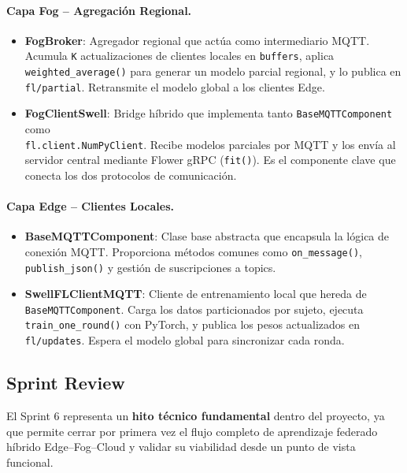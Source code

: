 \documentclass{report}
\begin{document}
\paragraph{Capa Fog -- Agregación Regional.}
\begin{itemize}
    \item \textbf{FogBroker}: Agregador regional que actúa como intermediario MQTT. Acumula \texttt{K} actualizaciones de clientes locales en \texttt{buffers}, aplica \texttt{weighted\_average()} para generar un modelo parcial regional, y lo publica en \texttt{fl/partial}. Retransmite el modelo global a los clientes Edge.
    
    \item \textbf{FogClientSwell}: Bridge híbrido que implementa tanto \texttt{BaseMQTTComponent} como \\ \texttt{fl.client.NumPyClient}. Recibe modelos parciales por MQTT y los envía al servidor central mediante Flower gRPC (\texttt{fit()}). Es el componente clave que conecta los dos protocolos de comunicación.
\end{itemize}

\paragraph{Capa Edge -- Clientes Locales.}
\begin{itemize}
    \item \textbf{BaseMQTTComponent}: Clase base abstracta que encapsula la lógica de conexión MQTT. Proporciona métodos comunes como \texttt{on\_message()}, \texttt{publish\_json()} y gestión de suscripciones a topics.
    
    \item \textbf{SwellFLClientMQTT}: Cliente de entrenamiento local que hereda de \texttt{BaseMQTTComponent}. Carga los datos particionados por sujeto, ejecuta \texttt{train\_one\_round()} con PyTorch, y publica los pesos actualizados en \texttt{fl/updates}. Espera el modelo global para sincronizar cada ronda.
\end{itemize}

\subsection{Sprint Review}

El Sprint 6 representa un \textbf{hito técnico fundamental} dentro del proyecto, ya que permite cerrar por primera vez el flujo completo de aprendizaje federado híbrido Edge--Fog--Cloud y validar su viabilidad desde un punto de vista funcional.
\end{document}
